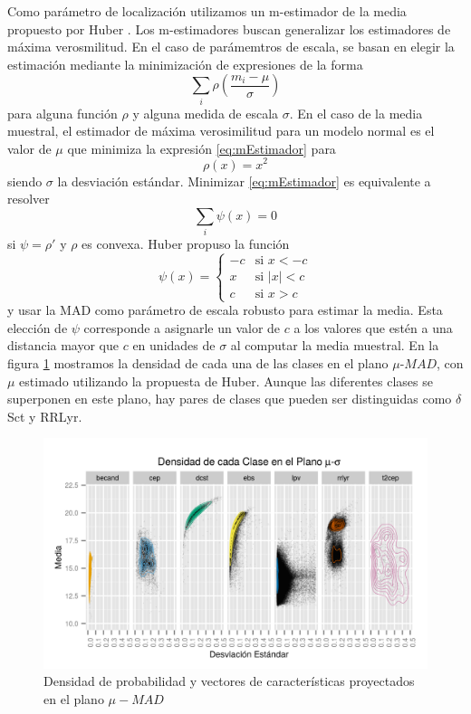 \documentclass[letterpaper,12pt]{book}
\begin{document}
Como parámetro de localización utilizamos un m-estimador de la media propuesto por Huber . Los m-estimadores buscan generalizar los estimadores de máxima verosmilitud. En el caso de parámemtros de escala, se basan en elegir la estimación mediante la  minimización de expresiones de la forma
\begin{equation}\label{eq:mEstimador}
\sum_i\rho\left(\frac{m_i-\mu}{\sigma}\right) 
\end{equation}
para alguna función $\rho$ y alguna medida de escala $\sigma$. En el caso de la media muestral, el estimador de máxima verosimilitud para un modelo normal es el valor de $\mu$ que minimiza la expresión \ref{eq:mEstimador} para 
\begin{equation}
  \rho(x) = x^2
\end{equation}
siendo $\sigma$ la desviación estándar. Minimizar \ref{eq:mEstimador} es equivalente a resolver 
\begin{equation}
  \sum_{i}\psi(x) = 0
\end{equation}
si $\psi = \rho'$ y $\rho$ es convexa. Huber propuso la función
\begin{equation} 
  \psi(x) = \begin{cases} 
    -c &\mbox{si } x < -c \\ 
    x & \mbox{si } |x|<c\\
    c & \mbox{si } x>c
  \end{cases}
\end{equation}
y usar la MAD como parámetro de escala robusto para estimar la media. Esta elección de $\psi$ corresponde a asignarle un valor de $c$ a los valores que estén a una distancia mayor que $c$ en unidades de $\sigma$ al computar la media muestral. En la figura \ref{fig:mediaDesv} mostramos la densidad de cada una de las clases en el plano $\mu$-$MAD$, con $\mu$ estimado utilizando la propuesta de Huber. Aunque las diferentes clases se superponen en este plano, hay pares de clases que pueden ser distinguidas como $\delta$Sct y RRLyr.


\begin{figure}
  \centering
  \includegraphics[width = \textwidth]{./img/CClasificacion/mediaDesv.png}
  \caption{Densidad de probabilidad y vectores de características proyectados en el plano $\mu - MAD$}
  \label{fig:mediaDesv}
  \centering
\end{figure}
\end{document}
